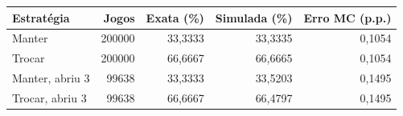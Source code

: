 \begin{tabular}{lrrrr}
\toprule
Estratégia & Jogos & Exata (\%) & Simulada (\%) & Erro MC (p.p.) \\
\midrule
Manter & 200000 & 33,3333 & 33,3335 & 0,1054 \\
Trocar & 200000 & 66,6667 & 66,6665 & 0,1054 \\
Manter, abriu 3 & 99638 & 33,3333 & 33,5203 & 0,1495 \\
Trocar, abriu 3 & 99638 & 66,6667 & 66,4797 & 0,1495 \\
\bottomrule
\end{tabular}
